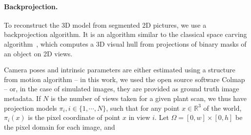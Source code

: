 
\paragraph{Backprojection. } To reconstruct the 3D model from segmented 2D
pictures, we use a backprojection algorithm. It is an algorithm similar to 
the classical space carving algorithm~\cite{kutulakos_theory_1999}, which computes a 3D visual hull from
projections of binary masks of an object on 2D views.

Camera poses and intrinsic
parameters are either estimated using a structure from motion algorithm -- in
this work, we used the open source software Colmap~\cite{schoenberger2016mvs,
schoenberger2016sfm} -- or, in the case of simulated images, they are provided
as ground truth image metadata. If $N$ is the number of views taken for a given plant
scan, we thus have projection models $\pi_i,i \in \{1,\cdots, N\}$,
such that for any point $x \in \mathbb{R}^3$ of the world, $\pi_i ({x})$ is the
pixel coordinate of point ${x}$ in view $i$. Let $\Omega = [0,w]
\times [0,h]$ be the pixel domain for each image, and

